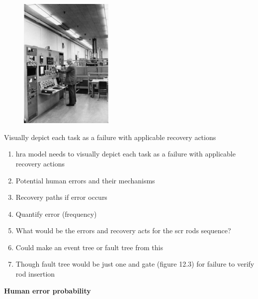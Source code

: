 \documentclass[aspectratio=1610,pdftex,dvipsnames,compress,xcolor={dvipsnames}]{beamer}
\newcommand{\acs}{\acrshort} %
\begin{document}
\begin{frame}{}
    \begin{figure}
        \centering
        \includegraphics[width=0.40\textwidth]{wpi.reactor2.jpg}
    \end{figure}
\end{frame}


\begin{frame}{Visually depict each task as a failure with applicable recovery actions}
    \begin{enumerate}[series=outerlist,topsep=0pt,itemsep=18pt,leftmargin=*,label=(\arabic*)]
        \item[]\acs{hra} model needs to visually depict each task as a failure with applicable recovery actions
        \item[]Potential human errors and their mechanisms
        \item[]Recovery paths if error occurs
        \item[]Quantify error (frequency)
        \item[]What would be the errors and recovery acts for the \acs{scr} rods sequence? 
        \item[]Could make an event tree or fault tree from this
        \item[]Though fault tree would be just one and gate (figure 12.3) for failure to verify rod insertion
    \end{enumerate}
\end{frame}


\begin{frame}[plain]{}
    \centering\LARGE\textbf{Human error probability}
\end{frame}
\end{document}
